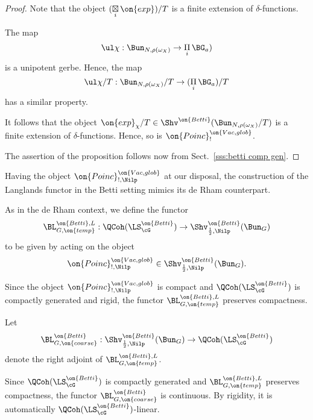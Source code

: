 \documentclass[9pt]{amsart}
\theoremstyle{remark}
\theoremstyle{definition}
\theoremstyle{remark}
\newcommand{\secref}[1]{Sect.~\ref{#1}}
\numberwithin{equation}{section}
\begin{document}
\begin{proof}

Note that the object $(\underset{i}\boxtimes\, \on{exp})/T$ is a finite extension of 
$\delta$-functions. 

\medskip

The map 
$$\ul\chi:\Bun_{N,\rho(\omega_X)}\to \underset{i}\Pi\, \BG_a)$$
is a unipotent gerbe. Hence, the map
$$\ul\chi/T:\Bun_{N,\rho(\omega_X)}/T\to (\underset{i}\Pi\, \BG_a)/T$$
has a similar property. 

\medskip

It follows that the object $\on{exp}_\chi/T\in  \Shv^{\on{Betti}}(\Bun_{N,\rho(\omega_X)}/T)$
is a finite extension of $\delta$-functions. Hence, so is $\on{Poinc}^{\on{Vac,glob}}_!$.

\medskip 

The assertion of the proposition follows now from \secref{sss:betti comp gen}.

\end{proof} 


Having the object $\on{Poinc}^{\on{Vac,glob}}_{!,\Nilp}$ at our disposal, the construction of the Langlands functor
in the Betti setting mimics its de Rham counterpart. 

\sssec{}

As in the de Rham context, we define the functor 
$$\BL^{\on{Betti},L}_{G,\on{temp}}:\QCoh(\LS^{\on{Betti}}_\cG)\to \Shv^{\on{Betti}}_{\frac{1}{2},\Nilp}(\Bun_G)$$
to be given by acting on the object
$$\on{Poinc}^{\on{Vac,glob}}_{!,\Nilp}\in \Shv^{\on{Betti}}_{\frac{1}{2},\Nilp}(\Bun_G).$$

\medskip

Since the object $\on{Poinc}^{\on{Vac,glob}}_{!,\Nilp}$ is compact and $\QCoh(\LS^{\on{Betti}}_\cG)$ is compactly generated and
rigid, the functor $\BL^{\on{Betti},L}_{G,\on{temp}}$ preserves compactness.

\sssec{}

Let 
$$\BL^{\on{Betti}}_{G,\on{coarse}}:\Shv^{\on{Betti}}_{\frac{1}{2},\Nilp}(\Bun_G)\to \QCoh(\LS^{\on{Betti}}_\cG)$$
denote the right adjoint of $\BL^{\on{Betti},L}_{G,\on{temp}}$. 

\medskip 

Since $\QCoh(\LS^{\on{Betti}}_\cG)$ is compactly generated and 
$\BL^{\on{Betti},L}_{G,\on{temp}}$ preserves compactness, the functor $\BL^{\on{Betti}}_{G,\on{coarse}}$ is continuous.
By rigidity, it is automatically $\QCoh(\LS^{\on{Betti}}_\cG)$-linear.
\end{document}
